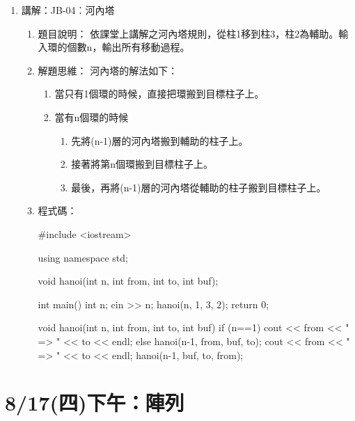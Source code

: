 \begin{enumerate}
	\item 講解：JB-04︰河內塔
	\begin{enumerate}
		\item 題目說明：
		\subitem 依課堂上講解之河內塔規則，從柱1移到柱3，柱2為輔助。輸入環的個數n，輸出所有移動過程。
		
		\item 解題思維：
		\subitem 河內塔的解法如下：
		\begin{enumerate}
			\item 當只有1個環的時候，直接把環搬到目標柱子上。
			\item 當有n個環的時候
			\begin{enumerate}
				\item 先將(n-1)層的河內塔搬到輔助的柱子上。
				\item 接著將第n個環搬到目標柱子上。
				\item 最後，再將(n-1)層的河內塔從輔助的柱子搬到目標柱子上。 
			\end{enumerate}
			
		\end{enumerate}
		
		\item 程式碼：
		\begin{cppcode}
			#include <iostream>
			
			using namespace std;
			
			void hanoi(int n, int from, int to, int buf);
			
			int main()
			{
				int n;
				cin >> n;
				hanoi(n, 1, 3, 2);
				return 0;
			}
			
			void hanoi(int n, int from, int to, int buf)
			{
				if (n==1) {
					cout << from << " => " << to << endl;
				} else {
				hanoi(n-1, from, buf, to);
				cout << from << " => " << to << endl;
				hanoi(n-1, buf, to, from);
			}
		}
	\end{cppcode}
\end{enumerate}

	
	
	
	
\end{enumerate}

\section{8/17(四)下午：陣列}

